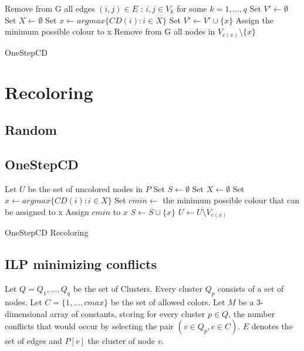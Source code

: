 \begin{algorithm}[h]
Remove from G all edges $(i,j) \in E$ : $i,j \in V_k$ for some $k=1,\ldots,q$\; 
Set $V' \gets \emptyset $\;
 {
  Set $X \gets \emptyset $\;
  Set $x \gets argmax\{CD(i) : i \in X \}$\;
  Set $V' \gets V' \cup \{x\}$\;
  Assign the minimum possible colour to x\;
  Remove from G all nodes in $V_{c(x)} \setminus \{x\} $\;
}
\;
\caption{OneStepCD}
\label{algo:osdc}
\end{algorithm}


\section{Recoloring}
\label{sec:recoloring}


\subsection{Random}


\subsection{OneStepCD}

\begin{algorithm}[h]
Let $U$ be the set of uncolored nodes in $P$\;
Set $S \gets \emptyset$\;
 {
  Set $X \gets \emptyset $\;
  Set $x \gets argmax\{CD(i) : i \in X \}$\;
  Set $cmin \gets$ the minimum possible colour that can be assigned to x\;
  Assign $cmin$ to $x$\;
  $S \gets S \cup \{x\}$\;
  $U \gets U \setminus V_{c(x)}$\;
}
\;
\caption{OneStepCD Recoloring}
\label{algo:osdc2}
\end{algorithm}

\clearpage

\subsection{ILP minimizing conflicts}

Let $Q = {Q_1,\ldots,Q_q}$ be the set of Clusters. Every cluster $Q_p$ consists of a set of nodes. Let $C=\{1,\ldots,cmax\}$ be the
set of allowed colors. Let $M$ be a 3-dimensional array of constants, storing
for every cluster $p \in Q$, the number conflicts that would occur by selecting the pair $(v \in Q_p, c \in C)$.
$E$ denotes the set of edges and $P[v]$ the cluster of node $v$.

